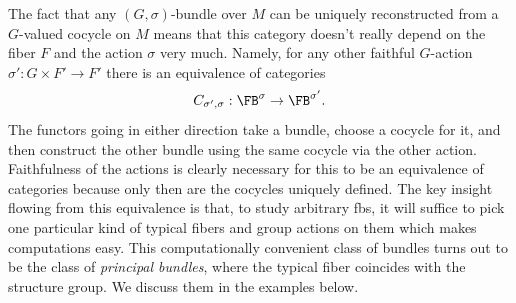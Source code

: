 The fact that any $(G,\sigma)$-bundle over $M$ can be uniquely reconstructed from a $G$-valued cocycle on $M$ means that this category doesn't really depend on the fiber $F$ and the action $\sigma$ very much. Namely, for any other faithful $G$-action $\sigma':G\times F'\to F'$ there is an equivalence of categories
\[C_{\sigma',\sigma}:\FB^\sigma\to \FB^{\sigma'}.\label{eq equivalence of bundle categories}\]
The functors going in either direction take a bundle, choose a cocycle for it, and then construct the other bundle using the same cocycle via the other action. Faithfulness of the actions is clearly necessary for this to be an equivalence of categories because only then are the cocycles uniquely defined. The key insight flowing from this equivalence is that, to study arbitrary \glspl{fb}, it will suffice to pick one particular kind of typical fibers and group actions on them which makes computations easy. This computationally convenient class of bundles turns out to be the class of \emph{principal bundles}, where the typical fiber coincides with the structure group. We discuss them in the examples below.



